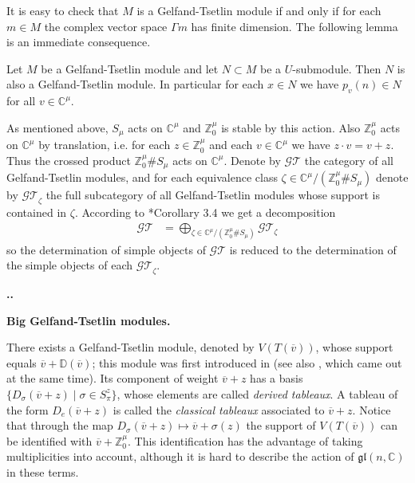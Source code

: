 \documentclass[11pt,fleqn]{amsart}
\renewcommand\thesection{\arabic{section}}
\newcounter{para}[section]
\renewcommand\thepara{\thesection.\arabic{para}}
\def\paragraph{%
 \noindent
 \refstepcounter{para}%
 \textbf{\thepara.}\hspace{1ex}%
}
\newcommand\about[1]{%
 {\bfseries#1.}%
}
\newcommand\CC{\mathbb C}
\newcommand\ZZ{\mathbb Z}
\newcommand\gl{\mathfrak{gl}}
\newcommand\vv{\overline{v}}
\newcommand\GT{\mathcal{GT}}
\newcommand\DD{\mathbb D}
\begin{document}
It is easy to check that $M$ is a Gelfand-Tsetlin module if and only if for 
each $m \in M$ the complex vector space $\Gamma m$ has finite dimension. The
following lemma is an immediate consequence.
\begin{Lemma}
\label{L:sub-gt}
Let $M$ be a Gelfand-Tsetlin module and let $N \subset M$ be a $U$-submodule.
Then $N$ is also a Gelfand-Tsetlin module. In particular for each $x \in N$
we have $p_v(n) \in N$ for all $v \in \CC^\mu$.
\end{Lemma}

As mentioned above, $S_\mu$ acts on $\CC^\mu$ and $\ZZ_0^\mu$ is stable by
this action. Also $\ZZ_0^\mu$ acts on $\CC^\mu$ by translation, i.e. for each
$z \in \ZZ_0^\mu$ and each $v \in \CC^\mu$ we have $z \cdot v = v + z$. Thus 
the crossed product $\ZZ_0^\mu \# S_\mu$ acts on $\CC^\mu$.
Denote by $\GT$ the category of all Gelfand-Tsetlin modules, and for each 
equivalence class $\zeta \in \CC^\mu / (\ZZ_0^\mu \# S_\mu)$ denote by 
$\GT_\zeta$ the full subcategory of all Gelfand-Tsetlin modules whose support 
is contained in $\zeta$. According to \cite{FO14}*{Corollary 3.4} we get a 
decomposition
\begin{align*}
\GT &= \bigoplus_{\zeta \in  \CC^\mu / (\ZZ_0^\mu \# S_\mu)} \GT_\zeta
\end{align*}
so the determination of simple objects of $\GT$ is reduced to the determination
of the simple objects of each $\GT_\zeta$. 

\paragraph
\about{Big Gelfand-Tsetlin modules}
\label{big-gt-modules}
There exists a Gelfand-Tsetlin module, denoted by $V(T(\vv))$, whose support 
equals $\vv + \DD(\vv)$; this module was first introduced in \cite{RZ18} 
(see also \cite{EMV18}, which came out at the same time). Its component of 
weight $\vv + z$ has a basis $\{D_\sigma(\vv+z) \mid \sigma \in S_\pi^z\}$, 
whose elements are called \emph{derived tableaux}. A tableau of the form 
$D_e(\vv + z)$ is called the \emph{classical tableaux} associated to $\vv + z$.
Notice that through the map $D_\sigma (\vv + z) \mapsto \vv + \sigma(z)$ the
support of $V(T(\vv))$ can be identified with $\vv + \ZZ^\mu_0$. This 
identification has the advantage of taking multiplicities into account, 
although it is hard to describe the action of $\gl(n,\CC)$ in these terms.
\end{document}
